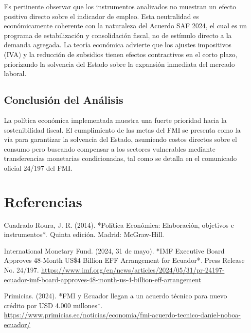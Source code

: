 \documentclass[12pt,spanish]{article}
\newenvironment{referenciasAPA}{
  \setlength{\parindent}{-1.27cm}
  \setlength{\leftskip}{1.27cm}
  \setlength{\parskip}{6pt}
}{\par}
\begin{document}
Es pertinente observar que los instrumentos analizados no muestran un
efecto positivo directo sobre el indicador de empleo. Esta neutralidad
es económicamente coherente con la naturaleza del Acuerdo SAF 2024, el
cual es un programa de estabilización y consolidación fiscal, no de
estímulo directo a la demanda agregada. La teoría económica advierte que
los ajustes impositivos (IVA) y la reducción de subsidios tienen efectos
contractivos en el corto plazo, priorizando la solvencia del Estado
sobre la expansión inmediata del mercado laboral.

\subsection{Conclusión del
Análisis}\label{conclusiuxf3n-del-anuxe1lisis}

La política económica implementada muestra una fuerte prioridad hacia la
sostenibilidad fiscal. El cumplimiento de las metas del FMI se presenta
como la vía para garantizar la solvencia del Estado, asumiendo costos
directos sobre el consumo pero buscando compensar a los sectores
vulnerables mediante transferencias monetarias condicionadas, tal como
se detalla en el comunicado oficial 24/197 del FMI.

\newpage

\section{Referencias}\label{referencias}

\begin{referenciasAPA}
Cuadrado Roura, J. R. (2014). *Política Económica: Elaboración, objetivos e instrumentos*. Quinta edición. Madrid: McGraw-Hill.

International Monetary Fund. (2024, 31 de mayo). *IMF Executive Board Approves 48-Month US\$4 Billion EFF Arrangement for Ecuador*. Press Release No. 24/197. \url{https://www.imf.org/en/news/articles/2024/05/31/pr-24197-ecuador-imf-board-approves-48-month-us-4-billion-eff-arrangement}

Primicias. (2024). *FMI y Ecuador llegan a un acuerdo técnico para nuevo crédito por USD 4.000 millones*. \url{https://www.primicias.ec/noticias/economia/fmi-acuerdo-tecnico-daniel-noboa-ecuador/}
\end{referenciasAPA}
\end{document}

